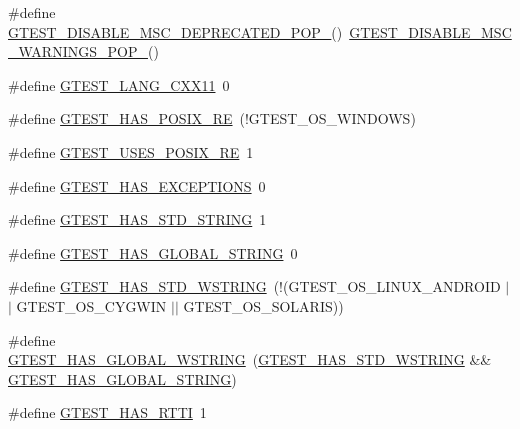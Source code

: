 \begin{DoxyCompactItemize}
\item 
\#define \mbox{\hyperlink{gtest-port_8h_aa0dc86dc9837f1610e91da65458f53b3}{G\+T\+E\+S\+T\+\_\+\+D\+I\+S\+A\+B\+L\+E\+\_\+\+M\+S\+C\+\_\+\+D\+E\+P\+R\+E\+C\+A\+T\+E\+D\+\_\+\+P\+O\+P\+\_\+}}()~\mbox{\hyperlink{gtest-port_8h_ab4c44546d6d9aced68993b87b608fc06}{G\+T\+E\+S\+T\+\_\+\+D\+I\+S\+A\+B\+L\+E\+\_\+\+M\+S\+C\+\_\+\+W\+A\+R\+N\+I\+N\+G\+S\+\_\+\+P\+O\+P\+\_\+}}()
\item 
\#define \mbox{\hyperlink{gtest-port_8h_a6e310924e9ce4a9f8fda1b189cc680c4}{G\+T\+E\+S\+T\+\_\+\+L\+A\+N\+G\+\_\+\+C\+X\+X11}}~0
\item 
\#define \mbox{\hyperlink{gtest-port_8h_af5c4295ea1d76f07f65934f659792431}{G\+T\+E\+S\+T\+\_\+\+H\+A\+S\+\_\+\+P\+O\+S\+I\+X\+\_\+\+RE}}~(!G\+T\+E\+S\+T\+\_\+\+O\+S\+\_\+\+W\+I\+N\+D\+O\+WS)
\item 
\#define \mbox{\hyperlink{gtest-port_8h_acecef794eeb09598cd47da764271cb18}{G\+T\+E\+S\+T\+\_\+\+U\+S\+E\+S\+\_\+\+P\+O\+S\+I\+X\+\_\+\+RE}}~1
\item 
\#define \mbox{\hyperlink{gtest-port_8h_aedcf220690e6589d0fc2bd3db768ea66}{G\+T\+E\+S\+T\+\_\+\+H\+A\+S\+\_\+\+E\+X\+C\+E\+P\+T\+I\+O\+NS}}~0
\item 
\#define \mbox{\hyperlink{gtest-port_8h_adba1121430c11cee8ba0c74e8cf6aa40}{G\+T\+E\+S\+T\+\_\+\+H\+A\+S\+\_\+\+S\+T\+D\+\_\+\+S\+T\+R\+I\+NG}}~1
\item 
\#define \mbox{\hyperlink{gtest-port_8h_a6ab57c4a17233dd4ed30c2926bb99cc5}{G\+T\+E\+S\+T\+\_\+\+H\+A\+S\+\_\+\+G\+L\+O\+B\+A\+L\+\_\+\+S\+T\+R\+I\+NG}}~0
\item 
\#define \mbox{\hyperlink{gtest-port_8h_a6e087748d8bbd2ca57c487b6ad268670}{G\+T\+E\+S\+T\+\_\+\+H\+A\+S\+\_\+\+S\+T\+D\+\_\+\+W\+S\+T\+R\+I\+NG}}~(!(G\+T\+E\+S\+T\+\_\+\+O\+S\+\_\+\+L\+I\+N\+U\+X\+\_\+\+A\+N\+D\+R\+O\+ID $\vert$$\vert$ G\+T\+E\+S\+T\+\_\+\+O\+S\+\_\+\+C\+Y\+G\+W\+IN $\vert$$\vert$ G\+T\+E\+S\+T\+\_\+\+O\+S\+\_\+\+S\+O\+L\+A\+R\+IS))
\item 
\#define \mbox{\hyperlink{gtest-port_8h_afca9ecaf5846561187a15b75013aa85b}{G\+T\+E\+S\+T\+\_\+\+H\+A\+S\+\_\+\+G\+L\+O\+B\+A\+L\+\_\+\+W\+S\+T\+R\+I\+NG}}~(\mbox{\hyperlink{gtest-port_8h_a6e087748d8bbd2ca57c487b6ad268670}{G\+T\+E\+S\+T\+\_\+\+H\+A\+S\+\_\+\+S\+T\+D\+\_\+\+W\+S\+T\+R\+I\+NG}} \&\& \mbox{\hyperlink{gtest-port_8h_a6ab57c4a17233dd4ed30c2926bb99cc5}{G\+T\+E\+S\+T\+\_\+\+H\+A\+S\+\_\+\+G\+L\+O\+B\+A\+L\+\_\+\+S\+T\+R\+I\+NG}})
\item 
\#define \mbox{\hyperlink{gtest-port_8h_a9ba781217167f905bff2f1c410a97930}{G\+T\+E\+S\+T\+\_\+\+H\+A\+S\+\_\+\+R\+T\+TI}}~1

\end{DoxyCompactItemize}
